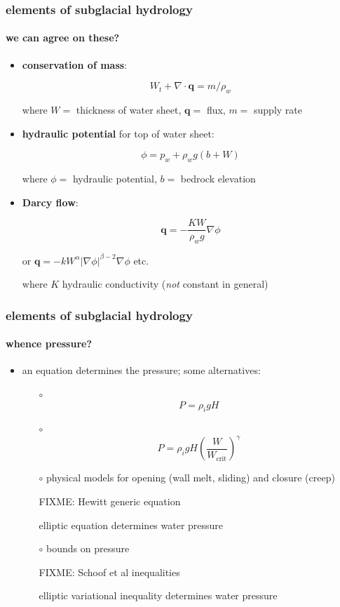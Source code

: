 \documentclass[hide notes,intlimits]{beamer}
\begin{document}
\begin{frame}
  \frametitle{elements of subglacial hydrology}
  \framesubtitle{we can agree on these?}

\newcommand{\bq}{\mathbf{q}}

  \begin{itemize}
    \item \textbf{conservation of mass}:
    
    $$W_t + \nabla \cdot \bq = m / \rho_w$$

where $W=$ thickness of water sheet, $\bq=$ flux, $m=$ supply rate

    \item \textbf{hydraulic potential} for top of water sheet:
    
    $$\phi = p_w + \rho_w g (b + W)$$

where $\phi=$ hydraulic potential, $b=$ bedrock elevation

    \item \textbf{Darcy flow}:
    
    $$\bq = - \frac{K W}{\rho_w g} \nabla \phi$$
    
    \scriptsize or \quad $\bq = - k W^\alpha |\nabla \phi|^{\beta - 2} \nabla \phi$ \quad etc.
    
\normalsize where $K$ hydraulic conductivity (\emph{not} constant in general)
  \end{itemize}

\end{frame}


\begin{frame}
  \frametitle{elements of subglacial hydrology}
  \framesubtitle{whence pressure?}

  \begin{itemize}
    \item an equation determines the pressure; some alternatives:
      \begin{itemize}
      \item[$\circ$]
        $$P = \rho_i g H$$
      \item[$\circ$]
        $$P = \rho_i g H \left(\frac{W}{W_{\text{crit}}}\right)^\gamma$$
      \item[$\circ$]  physical models for opening (wall melt, sliding) and closure (creep)
        
        FIXME: Hewitt generic equation

  elliptic equation determines water pressure

      \item[$\circ$] bounds on pressure
        
        FIXME: Schoof et al inequalities

  elliptic variational inequality determines water pressure
      \end{itemize}
  \end{itemize}

\end{frame}
\end{document}
